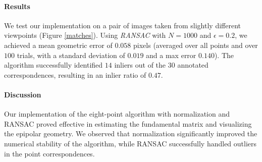 \paragraph{Results} We test our implementation on a pair of images taken from slightly different viewpoints (Figure \ref{matches}). Using \textit{RANSAC} with $N = 1000$ and $\epsilon = 0.2$, we achieved a mean geometric error of $0.058$ pixels (averaged over all points and over $100$ trials, with a standard deviation of $0.019$ and a max error $0.140$). The algorithm successfully identified $14$ inliers out of the $30$ annotated correspondences, resulting in an inlier ratio of $0.47$.

\paragraph{Discussion} Our implementation of the eight-point algorithm with normalization and RANSAC proved effective in estimating the fundamental matrix and visualizing the epipolar geometry. We observed that normalization significantly improved the numerical stability of the algorithm, while RANSAC successfully handled outliers in the point correspondences.